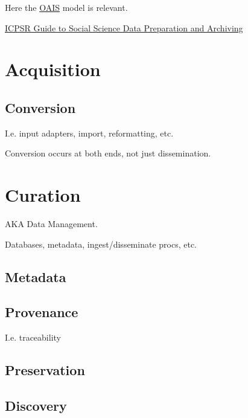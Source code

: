 \documentclass[reqno,12pt]{tufte-book}
\numberwithin{equation}{subsection}
\begin{document}
\begin{ednote}
  Here the
  \href{http://en.wikipedia.org/wiki/Open_Archival_Information_System}{OAIS}
  model is relevant.
\end{ednote}


\href{https://www.icpsr.umich.edu/icpsrweb/content/deposit/guide/}{ICPSR Guide to Social Science Data Preparation and Archiving}

\chapter{Acquisition}

\section{Conversion}
\label{sect:conversion}

I.e. input adapters, import, reformatting, etc.

Conversion occurs at both ends, not just dissemination.

\chapter{Curation}

AKA Data Management.

Databases, metadata, ingest/disseminate procs, etc.

\section{Metadata}
\label{sect:datameta}

\section{Provenance}
\label{sect:dataprovenance}

I.e. traceability

\section{Preservation}
\label{sect:datapreservation}

\section{Discovery}
\label{sect:discovery}
\end{document}
